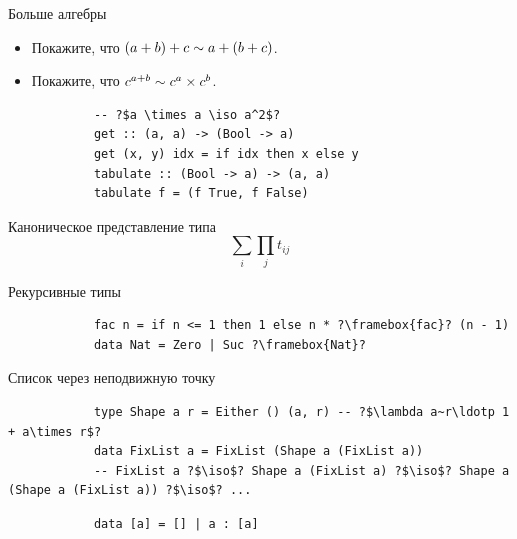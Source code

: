     \begin{frame}[fragile]{Больше алгебры}
        \pause
        \begin{itemize}
            \item[\todo] Покажите, что $(a + b) + c \sim a + (b + c)$.
            \item[\todo] Покажите, что $c^{a + b} \sim c^a\times c^b$.
        \end{itemize}
        \pause\vspace{1em}
        \begin{verbatim}
            -- ?$a \times a \iso a^2$?
            get :: (a, a) -> (Bool -> a)
            get (x, y) idx = if idx then x else y
            tabulate :: (Bool -> a) -> (a, a)
            tabulate f = (f True, f False)
        \end{verbatim}
    \end{frame}

    \begin{frame}[fragile]{Каноническое представление типа}
        \pause
        \[
            \sum_{i}\prod_{j} t_{ij}
        \]
    \end{frame}


    \begin{frame}[fragile]{Рекурсивные типы}
        \begin{verbatim}
            fac n = if n <= 1 then 1 else n * ?\framebox{fac}? (n - 1)
            data Nat = Zero | Suc ?\framebox{Nat}?
        \end{verbatim}
    \end{frame}

    \begin{frame}[fragile]{Список через неподвижную точку}
        \pause
        \begin{verbatim}
            type Shape a r = Either () (a, r) -- ?$\lambda a~r\ldotp 1 + a\times r$?
            data FixList a = FixList (Shape a (FixList a))
            -- FixList a ?$\iso$? Shape a (FixList a) ?$\iso$? Shape a (Shape a (FixList a)) ?$\iso$? ...
        \end{verbatim}
        \vspace{1em}
        \begin{verbatim}
            data [a] = [] | a : [a]
        \end{verbatim}
    \end{frame}

